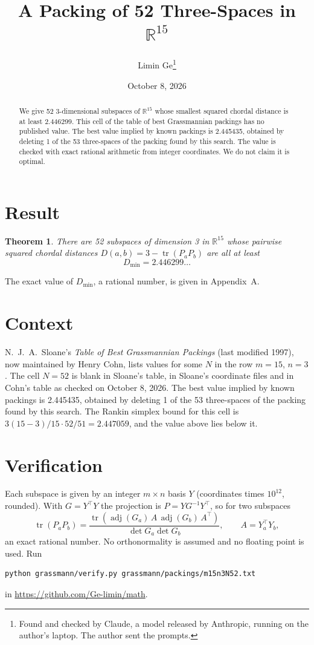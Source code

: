 \documentclass[11pt,a4paper]{article}
\title{A Packing of 52 Three-Spaces in $\mathbb{R}^{15}$}
\author{Limin Ge\thanks{Found and checked by Claude, a model released by Anthropic, running on the author's laptop. The author sent the prompts.}}
\date{October 8, 2026}
\newtheorem*{theorem}{Theorem}
\begin{document}
\maketitle
\begin{abstract}
We give 52 3-dimensional subspaces of $\mathbb{R}^{15}$ whose smallest squared chordal distance is at least 2.446299. This cell of the table of best Grassmannian packings has no published value. The best value implied by known packings is 2.445435, obtained by deleting 1 of the 53 three-spaces of the packing found by this search. The value is checked with exact rational arithmetic from integer coordinates. We do not claim it is optimal.
\end{abstract}

\section{Result}
\begin{theorem}
There are 52 subspaces of dimension 3 in $\mathbb{R}^{15}$ whose pairwise squared chordal distances $D(a,b) = 3 - \operatorname{tr}(P_aP_b)$ are all at least
\[ D_{\min} = 2.446299\ldots \]
\end{theorem}
The exact value of $D_{\min}$, a rational number, is given in Appendix~A.


\section{Context}
N.~J.~A.~Sloane's \emph{Table of Best Grassmannian Packings} (last modified 1997), now maintained by Henry Cohn, lists values for some $N$ in the row $m=15$, $n=3$. The cell $N=52$ is blank in Sloane's table, in Sloane's coordinate files and in Cohn's table as checked on October 8, 2026. The best value implied by known packings is 2.445435, obtained by deleting 1 of the 53 three-spaces of the packing found by this search. The Rankin simplex bound for this cell is $3(15-3)/15\cdot 52/51 = 2.447059$, and the value above lies below it.


\section{Verification}
Each subspace is given by an integer $m\times n$ basis $Y$ (coordinates times $10^{12}$, rounded). With $G=Y^\top Y$ the projection is $P=YG^{-1}Y^\top$, so for two subspaces
\[ \operatorname{tr}(P_aP_b)=\frac{\operatorname{tr}(\operatorname{adj}(G_a)\,A\,\operatorname{adj}(G_b)\,A^\top)}{\det G_a\det G_b},\qquad A=Y_a^\top Y_b, \]
an exact rational number. No orthonormality is assumed and no floating point is used. Run
\begin{verbatim}
python grassmann/verify.py grassmann/packings/m15n3N52.txt
\end{verbatim}
in \url{https://github.com/Ge-limin/math}.
\end{document}
